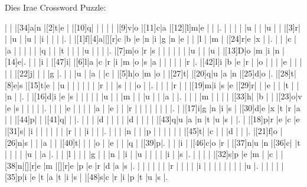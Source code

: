 \documentclass[12pt]{article}
\begin{document}
\libertine
\renewcommand\PuzzleClueFont{\rm\normalsize}
\begin{center}
  \huge{Dies Irae Crossword Puzzle:}
\end{center}
\vspace{1.5cm}
\begin{Puzzle}{22}{24}
  |{}  |{}  |[34]a|n   |[2]t|e   |{}  |[10]q|{}  |{}  |{}  |{}  |{}  |[9]v|o   |[11]c|a   |[12][l]m|e   |{}  |{}  |.
  |{}  |{}  |{}  |{}  |u   |{}  |{}  |u   |{}  |{}  |[3]r|{}  |{}  |u   |{}  |u   |{}  |i   |{}  |{}  |{}  |.
  |{}  |[1]f|[4]a|[][r]c   |b   |e   |n   |i  |g   |n   |e   |{}  |{}  |l   |{}  |m   |{}  |[24]r|e   |x   |{}  |.
  |{}  |{}  |c   |{}  |a   |{}  |{}  |{}  |{}  |{}  |q   |{}  |{}  |t   |{}  |{}  |{}  |u   |{}  |{}  |{}  |.
  |[7]m|o   |r   |s   |{}  |{}  |{}  |{}  |{}  |{}  |u   |{}  |{}  |u   |{}  |[13]D|o   |m   |i   |n   |[14]e|.
  |{}  |{}  |i   |{}  |[47]i|{}  |[6]l|a   |c   |r   |i   |m   |o   |s   |a   |{}  |{}  |{}  |{}  |{}  |r   |.
  |[42]l|i   |b   |e   |r   |{}  |o   |{}  |{}  |{}  |e   |{}  |{}  |{}  |{}  |{}  |[22]j|{}  |{}  |{}  |g   |.
  |{}  |{}  |u   |{}  |a   |{}  |c   |{}  |[5]h|o   |m   |o   |{}  |[27]t|{}  |[20]q|u   |a   |n   |[25]d|o   |.
  |[28]t|[8]e|s   |[15]t|e   |{}  |u   |{}  |{}  |{}  |{}  |{}  |{}  |r   |{}  |{}  |s   |{}  |{}  |o   |{}  |.
  |{}  |{}  |{}  |r   |{}  |{}  |[19]m|i   |s   |e   |[29]r|{}  |{}  |e   |{}  |{}  |t   |{}  |{}  |n   |{}  |.
  |{}  |[16]d|i   |e   |s   |{}  |{}  |{}  |{}  |{}  |u   |{}  |{}  |m   |{}  |{}  |u   |{}  |{}  |a   |{}  |.
  |{}  |{}  |{}  |m   |{}  |{}  |{}  |{}  |[33]h|{}  |b   |{}  |{}  |[23]o|v   |e   |s   |{}  |{}  |{}  |{}  |.
  |{}  |{}  |{}  |e   |{}  |{}  |{}  |{}  |a   |{}  |e   |{}  |{}  |r   |{}  |{}  |{}  |{}  |{}  |{}  |{}  |.
  |{}  |[17]i|g   |n   |i   |s   |{}  |[30]d|e   |x   |t   |r   |a   |{}  |{}  |[44]p|{}  |{}  |[41]q|{}  |{}  |.
  |{}  |{}  |{}  |d   |{}  |{}  |{}  |{}  |d   |{}  |{}  |{}  |{}  |[43]q|u   |a   |n   |t   |u   |s   |{}  |.
  |{}  |[18]p|r   |e   |c   |e   |[31]s|{}  |i   |{}  |{}  |{}  |{}  |{}  |{}  |r   |{}  |{}  |i   |{}  |{}  |.
  |{}  |{}  |{}  |n   |{}  |{}  |p   |{}  |{}  |{}  |{}  |{}  |{}  |[45]t|{}  |c   |{}  |{}  |d   |{}  |{}  |.
  |[21]f|o   |[26]n|s   |{}  |{}  |a   |{}  |{}  |[40]t|{}  |{}  |{}  |o   |{}  |e   |{}  |{}  |q   |{}  |[39]p|.
  |{}  |{}  |i   |{}  |[46]c|o   |r   |{}  |[37]n|u   |n   |[36]c|{}  |t   |{}  |{}  |{}  |{}  |u   |{}  |a   |.
  |{}  |{}  |l   |{}  |{}  |{}  |g   |{}  |{}  |n   |{}  |i   |{}  |u   |{}  |{}  |{}  |{}  |i   |{}  |s   |.
  |{}  |{}  |{}  |{}  |[32]s|p   |e   |m   |{}  |c   |{}  |[38]n|[][r]e   |m   |[][r]e   |p   |e   |r   |d   |a   |s   |.
  |{}  |{}  |{}  |{}  |{}  |{}  |r   |{}  |{}  |{}  |{}  |i   |{}  |{}  |{}  |{}  |{}  |{}  |{}  |{}  |u   |.
  |{}  |{}  |{}  |{}  |[35]p|i   |e   |t   |a   |t   |i   |s   |{}  |[48]s|c   |r   |i   |p   |t   |u   |s   |.
\end{Puzzle}
\end{document}
